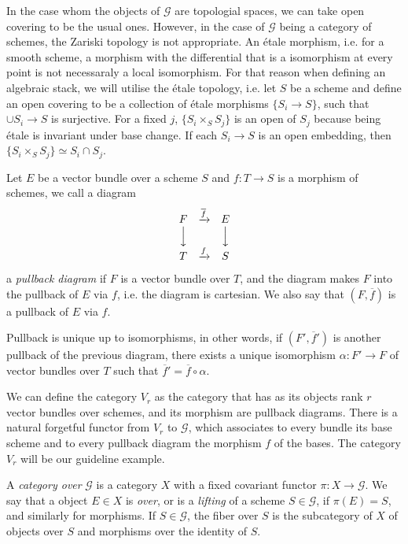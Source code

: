 \documentclass[
	oldfontcommands,
	sumario=abnt-6027-2012,
	12pt,			%
	openright,		%
	oneside,		%
	a4paper,		%
	english,		%
	brazil			%
	]{imecc-unicamp}
\begin{document}
In the case whom the objects of $\mathcal G$ are topologial spaces, we can take open covering to be the usual ones. However, in the case of $\mathcal G$ being a category of schemes, the Zariski topology is not appropriate. An \'etale morphism, i.e. for a smooth scheme, a morphism with the differential that is a isomorphism at every point is not necessaraly a local isomorphism. For that reason when defining an algebraic stack, we will utilise the \'etale topology, i.e. let $S$ be a scheme and define an open covering to be a collection of \'etale morphisms $\{S_i\rightarrow S \}$, such that $\cup S_i\rightarrow S$ is surjective. For a fixed $j$, $\{S_i\times_S S_j\}$ is an open of $S_j$ because being \'etale is invariant under base change. If each $S_i\rightarrow S$ is an open embedding, then $ \{S_i\times_S S_j\}\simeq S_i\cap S_j$.	


\begin{definition}
	Let $E$ be a vector bundle over a scheme $S$ and $f:T\rightarrow S$ is a morphism of schemes, we call a diagram$$
	\begin{matrix}
	F&\xrightarrow{\overline f}&E\\
	\Big\downarrow&&\Big\downarrow\\
	T&\xrightarrow{f}&S
	\end{matrix}
	$$
	a \textit{pullback diagram} if $F$ is a vector bundle over $T$, and the diagram makes $F$ into the pullback of $E$ via $f$, i.e. the diagram is cartesian. We also say that $(F, \overline f)$ is a pullback of $E$ via $f$.
\end{definition}

Pullback is unique up to isomorphisms, in other words, if $(F', \overline f')$ is another pullback of the previous diagram, there exists a unique isomorphism $\alpha: F'\rightarrow F$ of vector bundles over $T$ such that $\overline f'=\overline f\circ \alpha$.

We can define the category $V_r$ as the category that has as its objects rank $r$ vector bundles over schemes, and its morphism are pullback diagrams. There is a natural forgetful functor from $V_r$ to $\mathcal G$, which associates to every bundle its base scheme and to every pullback diagram the morphism $f$ of the bases. The category $V_r$ will be our guideline example.

\begin{definition}
	A \textit{category over} $\mathcal G$ is a category $X$ with a fixed covariant functor $\pi:X\rightarrow \mathcal G$. We say that a object $E\in X$ is \textit{over}, or is a \textit{lifting} of a scheme $S\in \mathcal G$, if $\pi(E)=S$, and similarly for morphisms. If $S\in \mathcal G$, the fiber over $S$ is the subcategory of $X$ of objects over $S$ and morphisms over the identity of $S$.
\end{definition}
\end{document}

